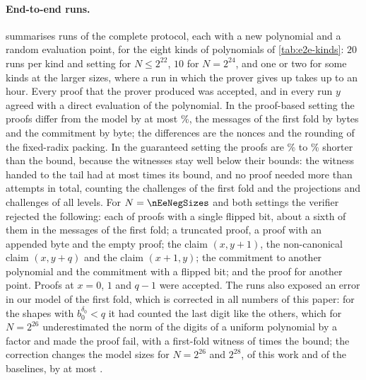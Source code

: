 \paragraph{End-to-end runs.}
 summarises \nEeRuns{} runs of the complete protocol, each with a new polynomial and a random evaluation point, for the eight kinds of polynomials of \cref{tab:e2e-kinds}: $20$ runs per kind and setting for $N\le2^{22}$, $10$ for $N=2^{24}$, and one or two for some kinds at the larger sizes, where a run in which the prover gives up takes up to an hour. Every proof that the prover produced was accepted, and in every run $y$ agreed with a direct evaluation of the polynomial. In the proof-based setting the proofs differ from the model by at most \nEeDevAbs\%, the messages of the first fold by \nEeFfDevMax{} bytes and the commitment by \nEeComDevMax{} byte; the differences are the nonces and the rounding of the fixed-radix packing. In the guaranteed setting the proofs are \nEeGcBelowLo\% to \nEeGcBelowHi\% shorter than the bound, because the witnesses stay well below their bounds: the witness handed to the tail had at most \nEeGcFfFillMax{} times its bound, and no proof needed more than \nEeGcAttMax{} attempts in total, counting the challenges of the first fold and the projections and challenges of all levels. For $N=\nEeNegSizes$ and both settings the verifier rejected the following: each of \nEeFlips{} proofs with a single flipped bit, about a sixth of them in the messages of the first fold; a truncated proof, a proof with an appended byte and the empty proof; the claim $(x,y+1)$, the non-canonical claim $(x,y+q)$ and the claim $(x+1,y)$; the commitment to another polynomial and the commitment with a flipped bit; and the proof for another point. Proofs at $x=0$, $1$ and $q-1$ were accepted. The runs also exposed an error in our model of the first fold, which is corrected in all numbers of this paper: for the shapes with $b_0^{\delta_0}<q$ it had counted the last digit like the others, which for $N=2^{26}$ underestimated the norm of the digits of a uniform polynomial by a factor \nEeBugS{} and made the proof fail, with a first-fold witness of \nEeBugFill{} times the bound; the correction changes the model sizes for $N=2^{26}$ and $2^{28}$, of this work and of the baselines, by at most \nModelFixMax\KB.

